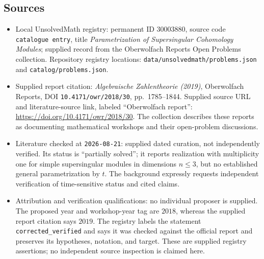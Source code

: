 \documentclass[11pt]{article}
\begin{document}
\subsection{Sources}
\begin{itemize}
\item Local UnsolvedMath registry: permanent ID \(30003880\), source code \texttt{catalogue entry}, title \emph{Parametrization of Supersingular Cohomology Modules}; supplied record from the Oberwolfach Reports Open Problems collection. Repository registry locations: \texttt{data/unsolvedmath/problems.json} and \texttt{catalog/problems.json}.
\item Supplied report citation: \emph{Algebraische Zahlentheorie (2019)}, Oberwolfach Reports, DOI \texttt{10.4171/owr/2018/30}, pp.\ 1785--1844. Supplied source URL and literature-source link, labeled ``Oberwolfach report'': \url{https://doi.org/10.4171/owr/2018/30}. The collection describes these reports as documenting mathematical workshops and their open-problem discussions.
\item Literature checked at \texttt{2026-08-21}: supplied dated curation, not independently verified. Its status is ``partially solved''; it reports realization with multiplicity one for simple supersingular modules in dimensions \(n\leq 3\), but no established general parametrization by \(t\). The background expressly requests independent verification of time-sensitive status and cited claims.
\item Attribution and verification qualifications: no individual proposer is supplied. The proposed year and workshop-year tag are \(2018\), whereas the supplied report citation says \(2019\). The registry labels the statement \texttt{corrected\_verified} and says it was checked against the official report and preserves its hypotheses, notation, and target. These are supplied registry assertions; no independent source inspection is claimed here.
\end{itemize}
\end{document}
